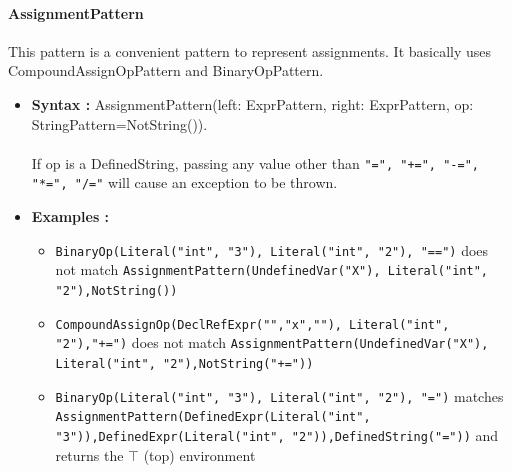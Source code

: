 \documentclass{report}
\begin{document}
\paragraph{AssignmentPattern}
This pattern is a convenient pattern to represent assignments. It basically uses CompoundAssignOpPattern and BinaryOpPattern.
\begin{itemize}	
	\item{\textbf{Syntax : }} AssignmentPattern(left: ExprPattern, right: ExprPattern, op: StringPattern=NotString()). ~\\~\\
	If op is a DefinedString, passing any value other than \lstinline|"=", "+=", "-=", "*=", "/="| will cause an exception to be thrown.
	\item{\textbf{Examples : }}
	\begin{itemize}
        	\item{}\lstinline|BinaryOp(Literal("int", "3"), Literal("int", "2"), "==")| does not match \lstinline|AssignmentPattern(UndefinedVar("X"), Literal("int", "2"),NotString())|
		\item{}\lstinline|CompoundAssignOp(DeclRefExpr("","x",""), Literal("int", "2"),"+=")| does not match \lstinline|AssignmentPattern(UndefinedVar("X"), Literal("int", "2"),NotString("+="))|
		\item{}\lstinline|BinaryOp(Literal("int", "3"), Literal("int", "2"), "=")| matches \lstinline| AssignmentPattern(DefinedExpr(Literal("int", "3")),DefinedExpr(Literal("int", "2")),DefinedString("="))| and returns the $\top$ (top) environment
	\end{itemize}
\end{itemize}
\end{document}
